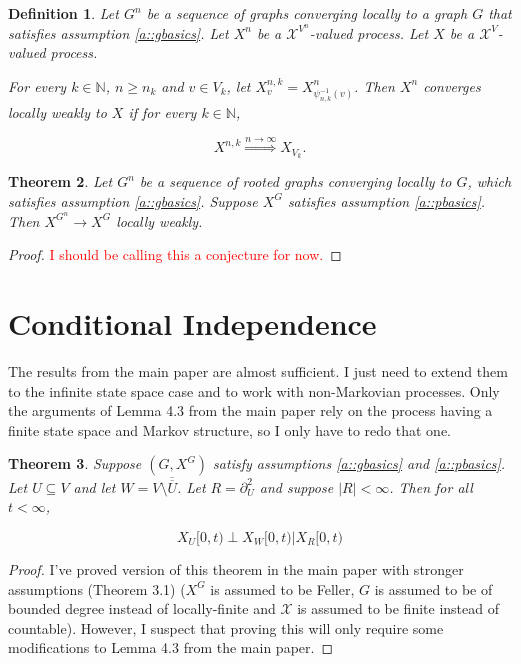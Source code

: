 \documentclass[12pt]{article}
\newcommand{\mb}{\mathbb}
\newcommand{\mc}{\mathcal}
\newcommand{\ra}{\rightarrow}
\newcommand{\ov}{\overline}
\newcommand{\os}{\overset}
\newcommand{\tr}{\textcolor{red}}
\newcommand{\ind}{\hspace{24pt}}
\newcommand{\sta}{\mc{X}}							%
\newcommand{\dneigh}[1]{\partial^2_{#1}}			%
\newcommand{\indx}[1]{^{#1}}						%
\newcommand{\Xf}{X}									%
\newcommand{\vind}[1]{_{#1}}						%
\newcommand{\tmi}[1]{#1}							%
\newcommand{\gind}[1]{^{#1}}						%
\newcommand{\trnc}[1]{_{#1}}						%
\newtheorem{thms}{Theorem}[section]
\newtheorem{defn}[thms]{Definition}
\begin{document}
\begin{defn}
Let \(G^n\) be a sequence of graphs converging locally to a graph \(G\) that satisfies assumption \ref{a::gbasics}. Let \(\Xf\indx{n}\) be a \(\sta^{V\indx{n}}\)-valued process. Let \(\Xf\) be a \(\sta^V\)-valued process. 

\ind For every \(k\in \mb{N}\), \(n \geq n_k\) and \(v \in V\trnc{k}\), let \(\Xf\indx{n,k}\vind{v} = \Xf\indx{n}\vind{\psi_{n,k}^{-1}(v)}\). Then \(\Xf^n\) converges locally weakly to \(\Xf\) if for every \(k \in \mb{N}\),

\[\Xf^{n,k} \os{n\ra\infty}{\Rightarrow} \Xf_{V_k}.\]
\label{WP::locweak}
\end{defn}

\begin{thms}
Let \(G\indx{n}\) be a sequence of rooted graphs converging locally to \(G\), which satisfies assumption \ref{a::gbasics}. Suppose \(\Xf\gind{G}\) satisfies assumption \ref{a::pbasics}. Then \(\Xf\gind{G\indx{n}} \ra \Xf\gind{G}\) locally weakly.
\label{WP::lblocweak}
\end{thms}
\begin{proof}
\tr{I should be calling this a conjecture for now.}
\end{proof}

\section{Conditional Independence}
\label{CI}

The results from the main paper are almost sufficient. I just need to extend them to the infinite state space case and to work with non-Markovian processes. Only the arguments of Lemma 4.3 from the main paper rely on the process having a finite state space and Markov structure, so I only have to redo that one.

\begin{thms}
Suppose \((G,\Xf\gind{G})\) satisfy assumptions \ref{a::gbasics} and \ref{a::pbasics}. Let \(U \subseteq V\) and let \(W = V\setminus \ov{\ov{U}}\). Let \(R = \dneigh{U}\) and suppose \(|R| < \infty\). Then for all \(t < \infty\),

\begin{equation}
\Xf\vind{U}\tmi{[0,t)}\perp \Xf\vind{W}\tmi{[0,t)}|\Xf\vind{R}\tmi{[0,t)}
\label{CI::CIeqn}
\end{equation}

\label{CI::CI}
\end{thms}
\begin{proof}
I've proved version of this theorem in the main paper with stronger assumptions (Theorem 3.1) (\(\Xf\gind{G}\) is assumed to be Feller, \(G\) is assumed to be of bounded degree instead of locally-finite and \(\sta\) is assumed to be finite instead of countable). However, I suspect that proving this will only require some modifications to Lemma 4.3 from the main paper.
\end{proof}
\end{document}
